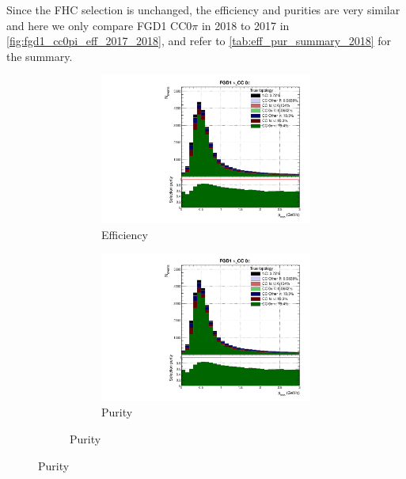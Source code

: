 Since the FHC selection is unchanged, the efficiency and purities are very similar and here we only compare FGD1 CC0$\pi$ in 2018 to 2017 in \autoref{fig:fgd1_cc0pi_eff_2017_2018}, and refer to \autoref{tab:eff_pur_summary_2018} for the summary.
\begin{figure}[h]
	\centering
	\caption*{2018 analysis}
	\begin{subfigure}[t]{\textwidth}
		\centering
	\begin{subfigure}[t]{0.4\textwidth}
		\includegraphics[width=\textwidth,page=1, trim={0mm 0mm 0mm 9mm}, clip]{figures/mach3/2018/Selection/2018_FullNoRedNDmatrix_rebin_verbose_may_diagnostics}
		\caption{Efficiency}
	\end{subfigure}
	\begin{subfigure}[t]{0.4\textwidth}
		\includegraphics[width=\textwidth,page=2, trim={0mm 0mm 0mm 9mm}, clip]{figures/mach3/2018/Selection/2018_FullNoRedNDmatrix_rebin_verbose_may_diagnostics}
		\caption{Purity}
	\end{subfigure}
\end{subfigure}


\end{figure}
